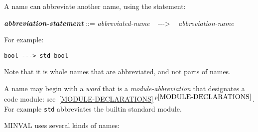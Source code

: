 \documentclass[12pt]{article}
\newcommand{\ABV}{-{}-{}->}
\newcommand{\emkey}[1]{{\em \bfseries #1}}
\newcommand{\itemref}[1]{\ref{#1}$\,^{p\pageref{#1}}$}
\newenvironment{indpar}[1][0.3in]%
	{\begin{list}{}%
		     {\setlength{\itemsep}{0in}%
		      \setlength{\topsep}{0in}%
		      \setlength{\parsep}{1ex}%
		      \setlength{\labelwidth}{#1}%
		      \setlength{\leftmargin}{#1}%
		      \addtolength{\leftmargin}{\labelsep}}%
	 \item}%
	{\end{list}}
\begin{document}
A name can abbreviate another name, using the statement:
\begin{indpar}
\emkey{abbreviation-statement} ::=
    {\em abbreviated-name} ~ \ABV{} ~ {\em abbreviation-name}
\end{indpar}
For example:
\begin{center}
\tt bool \ABV{} std bool
\end{center}

Note that it is whole names that are abbreviated, and not parts of
names.

A name may begin with a {\em word} that is a {\em module-abbreviation}
that designates a code module: see~\itemref{MODULE-DECLARATIONS}.
For example {\tt std} abbreviates the builtin standard module.

MINVAL uses several kinds of names:
\end{document}

